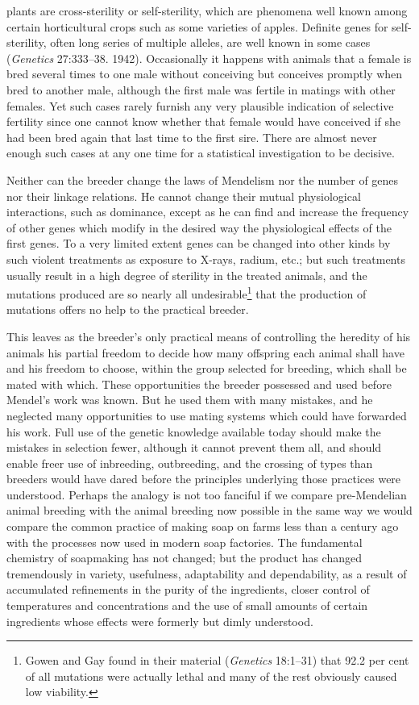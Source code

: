plants are cross-sterility or self-sterility, which are phenomena well known
among certain horticultural crops such as some varieties of
apples. Definite genes for self-sterility, often long series of multiple
alleles, are well known in some cases (\textit{Genetics} 27:333--38. 1942). Occasionally
it happens with animals that a female is bred several times to
one male without conceiving but conceives promptly when bred to
another male, although the first male was fertile in matings with other
females. Yet such cases rarely furnish any very plausible indication of
selective fertility since one cannot know whether that female would
have conceived if she had been bred again that last time to the first sire.
There are almost never enough such cases at any one time for a statistical
investigation to be decisive.

Neither can the breeder change the laws of Mendelism nor the number
of genes nor their linkage relations. He cannot change their mutual
physiological interactions, such as dominance, except as he can find and
increase the frequency of other genes which modify in the desired way
the physiological effects of the first genes. To a very limited extent
genes can be changed into other kinds by such violent treatments as
exposure to X-rays, radium, etc.; but such treatments usually result in
a high degree of sterility in the treated animals, and the mutations produced
are so nearly all undesirable\footnote{Gowen and Gay found in their material
(\textit{Genetics} 18:1--31) that 92.2 per cent of all mutations were actually
lethal and many of the rest obviously caused low viability.} that the production
of mutations offers no help to the practical breeder.

This leaves as the breeder's only practical means of controlling the
heredity of his animals his partial freedom to decide how many offspring
each animal shall have and his freedom to choose, within the
group selected for breeding, which shall be mated with which. These
opportunities the breeder possessed and used before Mendel's work was
known. But he used them with many mistakes, and he neglected many
opportunities to use mating systems which could have forwarded his
work. Full use of the genetic knowledge available today should make
the mistakes in selection fewer, although it cannot prevent them all,
and should enable freer use of inbreeding, outbreeding, and the crossing
of types than breeders would have dared before the principles
underlying those practices were understood.
Perhaps the analogy is not
too fanciful if we compare pre-Mendelian animal breeding with the
animal breeding now possible in the same way we would compare the
common practice of making soap on farms less than a century ago with
the processes now used in modern soap factories. The fundamental
chemistry of soapmaking has not changed; but the product has changed
tremendously in variety, usefulness, adaptability and dependability, as
a result of accumulated refinements in the purity of the ingredients,
closer control of temperatures and concentrations and the use of small
amounts of certain ingredients whose effects were formerly but dimly
understood.

